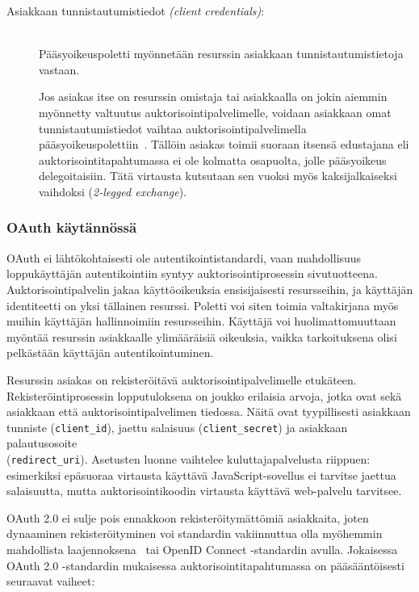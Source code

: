 \documentclass[finnish,gradu]{tktltiki}
\begin{document}
\begin{description}
   \item[Asiakkaan tunnistautumistiedot \emph{(client credentials)}:] \hfill \\
   Pääsyoikeuspoletti myönnetään resurssin asiakkaan tunnistautumistietoja vastaan.

  Jos asiakas itse on resurssin omistaja tai asiakkaalla on jokin aiemmin myönnetty valtuutus auktorisointipalvelimelle, voidaan asiakkaan omat tunnistautumistiedot vaihtaa auktorisointipalvelimella pääsyoikeuspolettiin~\cite{ietf_oauth2}. Tällöin asiakas toimii suoraan itsensä edustajana eli auktorisointitapahtumassa ei ole kolmatta osapuolta, jolle pääsyoikeus delegoitaisiin. Tätä virtausta kutsutaan sen vuoksi myös kaksijalkaiseksi vaihdoksi (\emph{2-legged exchange}).

   \end{description}



  \subsubsection{OAuth käytännössä} %
  \label{ssub:oauth_käytännössä}

  OAuth ei lähtökohtaisesti ole autentikointistandardi, vaan mahdollisuus loppukäyttäjän autentikointiin syntyy auktorisointiprosessin sivutuotteena. Auktorisointipalvelin jakaa käyttöoikeuksia ensisijaisesti resursseihin, ja käyttäjän identiteetti on yksi tällainen resurssi. Poletti voi siten toimia valtakirjana myös muihin käyttäjän hallinnoimiin resursseihin. Käyttäjä voi huolimattomuuttaan myöntää resurssin asiakkaalle ylimääräisiä oikeuksia, vaikka tarkoituksena olisi pelkästään käyttäjän autentikointuminen.

   Resurssin asiakas on rekisteröitävä auktorisointipalvelimelle etukäteen. Rekisteröintiprosessin lopputuloksena on joukko erilaisia arvoja, jotka ovat sekä asiakkaan että auktorisointipalvelimen tiedossa. Näitä ovat tyypillisesti asiakkaan tunniste (\verb!client_id!), jaettu salaisuus (\verb!client_secret!) ja asiakkaan pa\-lau\-tus\-osoite
   \\ (\verb!redirect_uri!). Asetusten luonne vaihtelee kuluttajapalvelusta riippuen: esimerkiksi epäsuoraa virtausta käyttävä JavaScript-sovellus ei tarvitse jaettua salaisuutta, mutta auktorisointikoodin virtausta käyttävä web-palvelu tarvitsee.

  OAuth 2.0 ei sulje pois ennakkoon rekisteröitymättömiä asiakkaita, joten dynaaminen rekisteröityminen voi standardin vakiinnuttua olla myöhemmin mahdollista laajennoksena~\cite{ietf_oauth2_unregistered_clients} tai OpenID Connect -standardin avulla. Jokaisessa OAuth 2.0 -standardin mukaisessa auktorisointitapahtumassa on pääsääntöisesti seuraavat vaiheet:
\end{document}
